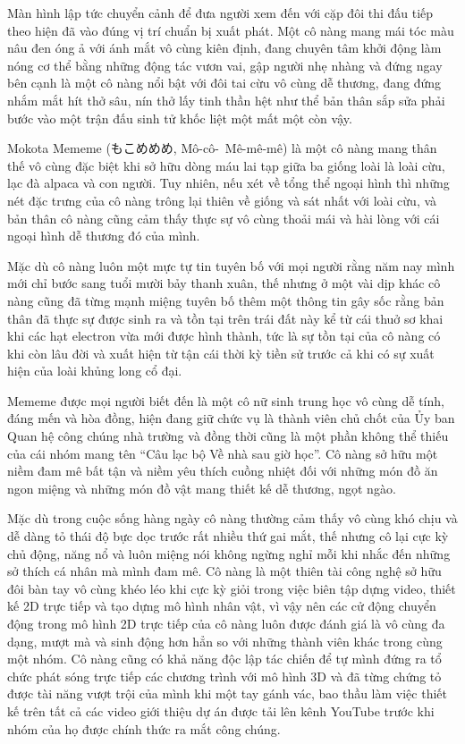 \documentclass[../main.tex]{subfiles}
\begin{document}
Màn hình lập tức chuyển cảnh để đưa người xem đến với cặp đôi thi đấu tiếp theo hiện đã vào đúng vị trí chuẩn bị xuất phát. Một cô nàng mang mái tóc màu nâu đen óng ả với ánh mắt vô cùng kiên định, đang chuyên tâm khởi động làm nóng cơ thể bằng những động tác vươn vai, gập người nhẹ nhàng và đứng ngay bên cạnh là một cô nàng nổi bật với đôi tai cừu vô cùng dễ thương, đang đứng nhắm mắt hít thở sâu, nín thở lấy tinh thần hệt như thể bản thân sắp sửa phải bước vào một trận đấu sinh tử khốc liệt một mất một còn vậy.

\chrint


Mokota Mememe (もこめめめ, Mô-cô-\ Mê-mê-mê) là một cô nàng mang thân thế vô cùng đặc biệt khi sở hữu dòng máu lai tạp giữa ba giống loài là loài cừu, lạc đà alpaca và con người. Tuy nhiên, nếu xét về tổng thể ngoại hình thì những nét đặc trưng của cô nàng trông lại thiên về giống và sát nhất với loài cừu, và bản thân cô nàng cũng cảm thấy thực sự vô cùng thoải mái và hài lòng với cái ngoại hình dễ thương đó của mình.

Mặc dù cô nàng luôn một mực tự tin tuyên bố với mọi người rằng năm nay mình mới chỉ bước sang tuổi mười bảy thanh xuân, thế nhưng ở một vài dịp khác cô nàng cũng đã từng mạnh miệng tuyên bố thêm một thông tin gây sốc rằng bản thân đã thực sự được sinh ra và tồn tại trên trái đất này kể từ cái thuở sơ khai khi các hạt electron vừa mới được hình thành, tức là sự tồn tại của cô nàng có khi còn lâu đời và xuất hiện từ tận cái thời kỳ tiền sử trước cả khi có sự xuất hiện của loài khủng long cổ đại.

Mememe được mọi người biết đến là một cô nữ sinh trung học vô cùng dễ tính, đáng mến và hòa đồng, hiện đang giữ chức vụ là thành viên chủ chốt của Ủy ban Quan hệ công chúng nhà trường và đồng thời cũng là một phần không thể thiếu của cái nhóm mang tên ``Câu lạc bộ Về nhà sau giờ học''. Cô nàng sở hữu một niềm đam mê bất tận và niềm yêu thích cuồng nhiệt đối với những món đồ ăn ngon miệng và những món đồ vật mang thiết kế dễ thương, ngọt ngào.

Mặc dù trong cuộc sống hàng ngày cô nàng thường cảm thấy vô cùng khó chịu và dễ dàng tỏ thái độ bực dọc trước rất nhiều thứ gai mắt, thế nhưng cô lại cực kỳ chủ động, năng nổ và luôn miệng nói không ngừng nghỉ mỗi khi nhắc đến những sở thích cá nhân mà mình đam mê. Cô nàng là một thiên tài công nghệ sở hữu đôi bàn tay vô cùng khéo léo khi cực kỳ giỏi trong việc biên tập dựng video, thiết kế 2D trực tiếp và tạo dựng mô hình nhân vật, vì vậy nên các cử động chuyển động trong mô hình 2D trực tiếp của cô nàng luôn được đánh giá là vô cùng đa dạng, mượt mà và sinh động hơn hẳn so với những thành viên khác trong cùng một nhóm. Cô nàng cũng có khả năng độc lập tác chiến để tự mình đứng ra tổ chức phát sóng trực tiếp các chương trình với mô hình 3D và đã từng chứng tỏ được tài năng vượt trội của mình khi một tay gánh vác, bao thầu làm việc thiết kế trên tất cả các video giới thiệu dự án được tải lên kênh YouTube trước khi nhóm của họ được chính thức ra mắt công chúng.
\end{document}
